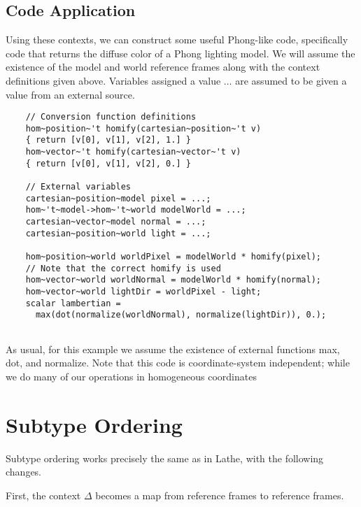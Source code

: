 \documentclass{article}
\begin{document}
\subsection{Code Application}
Using these contexts, we can construct some useful Phong-like code, specifically code that returns the diffuse color of a Phong lighting model.  
We will assume the existence of the \textsf{model} and \textsf{world} reference frames along with the context definitions given above.
Variables assigned a value $\dots$ are assumed to be given a value from an external source.

\begin{lstlisting}
	// Conversion function definitions
	hom~position~'t homify(cartesian~position~'t v) 
	{ return [v[0], v[1], v[2], 1.] }
	hom~vector~'t homify(cartesian~vector~'t v) 
	{ return [v[0], v[1], v[2], 0.] }
	
	// External variables
	cartesian~position~model pixel = ...;
	hom~'t~model->hom~'t~world modelWorld = ...;
	cartesian~vector~model normal = ...;
	cartesian~position~world light = ...;
	
	hom~position~world worldPixel = modelWorld * homify(pixel);
	// Note that the correct homify is used
	hom~vector~world worldNormal = modelWorld * homify(normal);
	hom~vector~world lightDir = worldPixel - light;
	scalar lambertian = 
	  max(dot(normalize(worldNormal), normalize(lightDir)), 0.);
	
\end{lstlisting}

As usual, for this example we assume the existence of external functions \textsf{max}, \textsf{dot}, and \textsf{normalize}.  Note that this code is coordinate-system independent; while we do many of our operations in homogeneous coordinates

\section{Subtype Ordering}
Subtype ordering works precisely the same as in Lathe, with the following changes.

First, the context $\Delta$ becomes a map from reference frames to reference frames.
\end{document}
